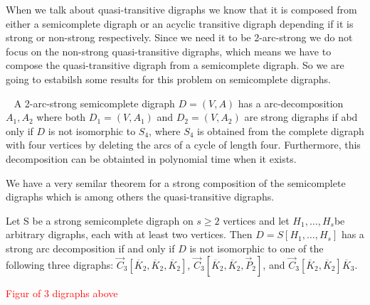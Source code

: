 When we talk about quasi-transitive digraphs we know that it is composed from either a semicomplete digraph or an acyclic transitive digraph depending if it is strong or non-strong respectively.
Since we need it to be 2-arc-strong we do not focus on the non-strong quasi-transitive digraphs, which means we have to compose the quasi-transitive digraph from a semicomplete digraph. 
So we are going to estabilsh some results for this problem on semicomplete digraphs.
\begin{thm}~\cite{bangjgt}
    A 2-arc-strong semicomplete digraph $D=(V,A)$ has a arc-decomposition $A_1,A_2$ where both $D_1=(V,A_1)$ and $D_2=(V,A_2)$ are strong digraphs if abd only if $D$ is not isomorphic to $S_4$, where $S_4$ is obtained from the complete digraph with four vertices by deleting the arcs of a cycle of length four. Furthermore, this decomposition can be obtainted in polynomial time when it exists. 
\end{thm}
We have a very semilar theorem for a strong composition of the semicomplete digraphs which is among others the quasi-transitive digraphs.
\begin{thm}
    Let S be a strong semicomplete digraph on $s\geq 2$ vertices and let $H_1,\dots ,H_s$be arbitrary digraphs, each with at least two vertices. Then $D=S[H_1,\dots ,H_s]$ has a strong arc decomposition if and only if $D$ is not isomorphic to one of the following three digraphs: $\overrightarrow{C}_3[\overline{K}_2,\overline{K}_2,\overline{K}_2]$, $\overrightarrow{C}_3[\overline{K}_2,\overline{K}_2,\overrightarrow{P}_2]$, and $\overrightarrow{C}_3[\overline{K}_2,\overline{K}_2]\overline{K}_3$.
\end{thm}
\textcolor{red}{Figur of 3 digraphs above}

